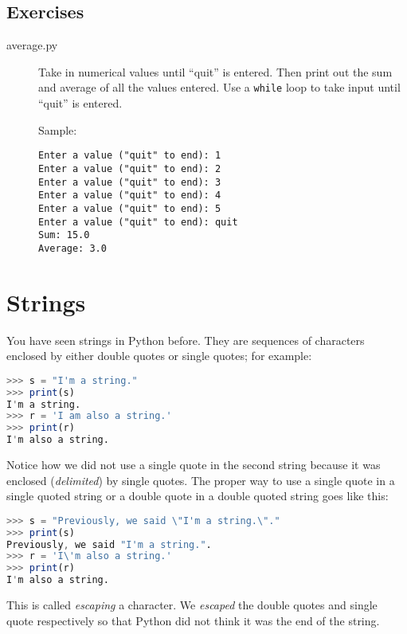 \documentclass[11pt]{cselabheader}
\begin{document}
\subsection{Exercises}
\label{subsec:listsex}

\begin{description}
  \item[average.py] Take in numerical values until ``quit'' is entered. Then print out the sum and average of all the values entered. Use a \lstinline{while} loop to take input until ``quit'' is entered.

    Sample:
    \begin{lstlisting}[style=ipython]
Enter a value ("quit" to end): 1
Enter a value ("quit" to end): 2
Enter a value ("quit" to end): 3
Enter a value ("quit" to end): 4
Enter a value ("quit" to end): 5
Enter a value ("quit" to end): quit
Sum: 15.0
Average: 3.0
    \end{lstlisting}
\end{description}


\section{Strings}

You have seen strings in Python before. They are sequences of characters
enclosed by either double quotes or single quotes; for example:
\begin{lstlisting}[style=ipython,language=Octave] % string escaping issues with Python style
>>> s = "I'm a string."
>>> print(s)
I'm a string.
>>> r = 'I am also a string.'
>>> print(r)
I'm also a string.
\end{lstlisting}

Notice how we did not use a single quote in the second string because it was
enclosed (\emph{delimited}) by single quotes. The proper way to use a single
quote in a single quoted string or a double quote in a double quoted string
goes like this:
\begin{lstlisting}[style=ipython,language=Octave]
>>> s = "Previously, we said \"I'm a string.\"."
>>> print(s)
Previously, we said "I'm a string.".
>>> r = 'I\'m also a string.'
>>> print(r)
I'm also a string.
\end{lstlisting}
This is called \emph{escaping} a character. We \emph{escaped} the double quotes
and single quote respectively so that Python did not think it was the end of
the string.

\end{document}
